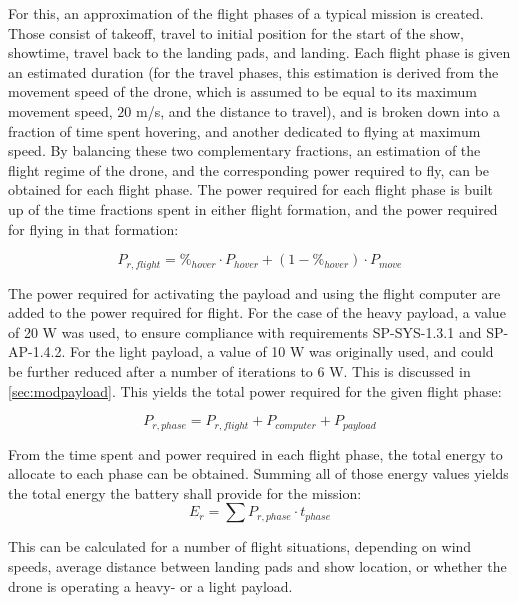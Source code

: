 For this, an approximation of the flight phases of a typical mission is created. Those consist of takeoff, travel to initial position for the start of the show, showtime, travel back to the landing pads, and landing. Each flight phase is given an estimated duration (for the travel phases, this estimation is derived from the movement speed of the drone, which is assumed to be equal to its maximum movement speed, $20$ m/s, and the distance to travel), and is broken down into a fraction of time spent hovering, and another dedicated to flying at maximum speed. By balancing these two complementary fractions, an estimation of the flight regime of the drone, and the corresponding power required to fly, can be obtained for each flight phase. The power required for each flight phase is built up of the time fractions spent in either flight formation, and the power required for flying in that formation:

\begin{equation}
    P_{\mathit{r,flight}} = \%_{\mathit{hover}} \cdot P_{\mathit{hover}} + (1 - \%_{\mathit{hover}}) \cdot P_{\mathit{move}}
\end{equation}

The power required for activating the payload and using the flight computer are added to the power required for flight. For the case of the heavy payload, a value of 20 W was used, to ensure compliance with requirements SP-SYS-1.3.1 and SP-AP-1.4.2. For the light payload, a value of 10 W was originally used, and could be further reduced after a number of iterations to 6 W. This is discussed in \autoref{sec:modpayload}. This yields the total power required for the given flight phase:

\begin{equation}
    P_{r,phase} = P_{\mathit{r,flight}} + P_{\mathit{computer}} + P_{\mathit{payload}}
\end{equation}

From the time spent and power required in each flight phase, the total energy to allocate to each phase can be obtained. Summing all of those energy values yields the total energy the battery shall provide for the mission:
\vspace{-0.5mm}
\begin{equation}
    E_r = \sum P_{\mathit{r,phase}} \cdot t_{\mathit{phase}}
\end{equation}

This can be calculated for a number of flight situations, depending on wind speeds, average distance between landing pads and show location, or whether the drone is operating a heavy- or a light payload.

